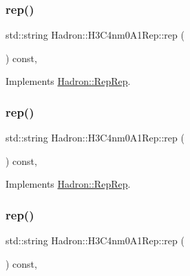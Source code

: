 \subsubsection{\texorpdfstring{rep()}{rep()}\hspace{0.1cm}{\footnotesize\ttfamily [1/3]}}
{\footnotesize\ttfamily std\+::string Hadron\+::\+H3\+C4nm0\+A1\+Rep\+::rep (\begin{DoxyParamCaption}{ }\end{DoxyParamCaption}) const\hspace{0.3cm}{\ttfamily [inline]}, {\ttfamily [virtual]}}



Implements \mbox{\hyperlink{structHadron_1_1RepRep_ab3213025f6de249f7095892109575fde}{Hadron\+::\+Rep\+Rep}}.

\mbox{\label{structHadron_1_1H3C4nm0A1Rep_a3634b28d2dcd2a2aab44846494b1f39c}} 
\subsubsection{\texorpdfstring{rep()}{rep()}\hspace{0.1cm}{\footnotesize\ttfamily [2/3]}}
{\footnotesize\ttfamily std\+::string Hadron\+::\+H3\+C4nm0\+A1\+Rep\+::rep (\begin{DoxyParamCaption}{ }\end{DoxyParamCaption}) const\hspace{0.3cm}{\ttfamily [inline]}, {\ttfamily [virtual]}}



Implements \mbox{\hyperlink{structHadron_1_1RepRep_ab3213025f6de249f7095892109575fde}{Hadron\+::\+Rep\+Rep}}.

\mbox{\label{structHadron_1_1H3C4nm0A1Rep_a3634b28d2dcd2a2aab44846494b1f39c}} 
\subsubsection{\texorpdfstring{rep()}{rep()}\hspace{0.1cm}{\footnotesize\ttfamily [3/3]}}
{\footnotesize\ttfamily std\+::string Hadron\+::\+H3\+C4nm0\+A1\+Rep\+::rep (\begin{DoxyParamCaption}{ }\end{DoxyParamCaption}) const\hspace{0.3cm}{\ttfamily [inline]}, {\ttfamily [virtual]}}



